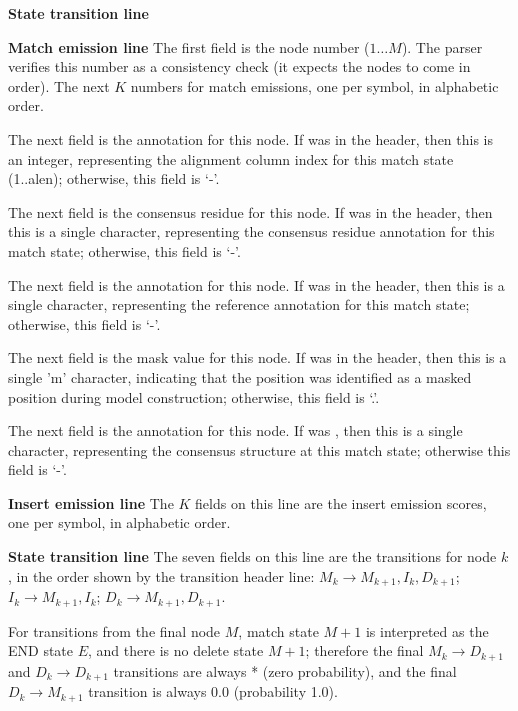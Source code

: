 \begin{sreitems}{\textbf{State transition line}}

\item [\textbf{Match emission line}] The first field is the node
number ($1 \ldots M$).  The parser verifies this number as a
consistency check (it expects the nodes to come in order). The next
$K$ numbers for match emissions, one per symbol, in alphabetic order.

The next field is the  annotation for this node.  If
 was  in the header, then this is an integer,
representing the alignment column index for this match state
(1..alen); otherwise, this field is `-'.

The next field is the  consensus residue for this node.  If
 was  in the header, then this is a single
character, representing the consensus residue annotation for this
match state; otherwise, this field is `-'.

The next field is the  annotation for this node.  If
 was  in the header, then this is a single
character, representing the reference annotation for this match state;
otherwise, this field is `-'.

The next field is the  mask value for this node.  If
 was  in the header, then this is a single 'm'
character, indicating that the position was identified as a masked 
position during model construction; otherwise, this field is `.'.

The next field is the  annotation for this node.  If
 was , then this is a single character,
representing the consensus structure at this match state; otherwise
this field is `-'.

\item [\textbf{Insert emission line}] The $K$ fields on this line are
the insert emission scores, one per symbol, in alphabetic order.

\item [\textbf{State transition line}] The seven fields on this line
are the transitions for node $k$, in the order shown by the transition
header line: $M_k \rightarrow M_{k+1}, I_{k}, D_{k+1}$; $ I_k
\rightarrow M_{k+1}, I_k$; $D_{k} \rightarrow M_{k+1}, D_{k+1}$.

For transitions from the final node $M$, match state $M+1$ is
interpreted as the END state $E$, and there is no delete state $M+1$;
therefore the final $M_k \rightarrow D_{k+1}$ and $D_k \rightarrow
D_{k+1}$ transitions are always * (zero probability), and the final
$D_k \rightarrow M_{k+1}$ transition is always 0.0 (probability 1.0).
\end{sreitems}

